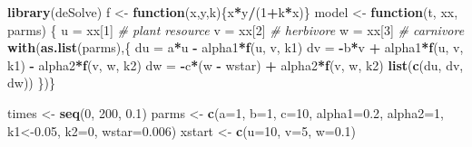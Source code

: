\documentclass[
]{book}
\newenvironment{Shaded}{\begin{snugshade}}{\end{snugshade}}
\newcommand{\AttributeTok}[1]{\textcolor[rgb]{0.13,0.29,0.53}{#1}}
\newcommand{\CommentTok}[1]{\textcolor[rgb]{0.56,0.35,0.01}{\textit{#1}}}
\newcommand{\ControlFlowTok}[1]{\textcolor[rgb]{0.13,0.29,0.53}{\textbf{#1}}}
\newcommand{\DecValTok}[1]{\textcolor[rgb]{0.00,0.00,0.81}{#1}}
\newcommand{\FloatTok}[1]{\textcolor[rgb]{0.00,0.00,0.81}{#1}}
\newcommand{\FunctionTok}[1]{\textcolor[rgb]{0.13,0.29,0.53}{\textbf{#1}}}
\newcommand{\NormalTok}[1]{#1}
\newcommand{\OtherTok}[1]{\textcolor[rgb]{0.56,0.35,0.01}{#1}}
\newcommand{\SpecialCharTok}[1]{\textcolor[rgb]{0.81,0.36,0.00}{\textbf{#1}}}
\theoremstyle{definition}
\theoremstyle{definition}
\theoremstyle{definition}
\theoremstyle{definition}
\theoremstyle{remark}
\begin{document}
\begin{Shaded}
\begin{Highlighting}[]
\FunctionTok{library}\NormalTok{(deSolve)}
\NormalTok{f }\OtherTok{\textless{}{-}} \ControlFlowTok{function}\NormalTok{(x,y,k)\{x}\SpecialCharTok{*}\NormalTok{y}\SpecialCharTok{/}\NormalTok{(}\DecValTok{1}\SpecialCharTok{+}\NormalTok{k}\SpecialCharTok{*}\NormalTok{x)\}}
\NormalTok{model }\OtherTok{\textless{}{-}} \ControlFlowTok{function}\NormalTok{(t, xx, parms) \{}
\NormalTok{    u }\OtherTok{=}\NormalTok{ xx[}\DecValTok{1}\NormalTok{] }\CommentTok{\# plant resource}
\NormalTok{    v }\OtherTok{=}\NormalTok{ xx[}\DecValTok{2}\NormalTok{] }\CommentTok{\# herbivore}
\NormalTok{    w }\OtherTok{=}\NormalTok{ xx[}\DecValTok{3}\NormalTok{] }\CommentTok{\# carnivore}
    \FunctionTok{with}\NormalTok{(}\FunctionTok{as.list}\NormalTok{(parms),\{}
\NormalTok{    du }\OtherTok{=}\NormalTok{ a}\SpecialCharTok{*}\NormalTok{u }\SpecialCharTok{{-}}\NormalTok{ alpha1}\SpecialCharTok{*}\FunctionTok{f}\NormalTok{(u, v, k1)}
\NormalTok{    dv }\OtherTok{=} \SpecialCharTok{{-}}\NormalTok{b}\SpecialCharTok{*}\NormalTok{v }\SpecialCharTok{+}\NormalTok{ alpha1}\SpecialCharTok{*}\FunctionTok{f}\NormalTok{(u, v, k1) }\SpecialCharTok{{-}}\NormalTok{ alpha2}\SpecialCharTok{*}\FunctionTok{f}\NormalTok{(v, w, k2)}
\NormalTok{    dw }\OtherTok{=} \SpecialCharTok{{-}}\NormalTok{c}\SpecialCharTok{*}\NormalTok{(w }\SpecialCharTok{{-}}\NormalTok{ wstar) }\SpecialCharTok{+}\NormalTok{ alpha2}\SpecialCharTok{*}\FunctionTok{f}\NormalTok{(v, w, k2)}
    \FunctionTok{list}\NormalTok{(}\FunctionTok{c}\NormalTok{(du, dv, dw))}
\NormalTok{\})\}}

\NormalTok{times }\OtherTok{\textless{}{-}} \FunctionTok{seq}\NormalTok{(}\DecValTok{0}\NormalTok{, }\DecValTok{200}\NormalTok{, }\FloatTok{0.1}\NormalTok{)}
\NormalTok{parms }\OtherTok{\textless{}{-}} \FunctionTok{c}\NormalTok{(}\AttributeTok{a=}\DecValTok{1}\NormalTok{, }\AttributeTok{b=}\DecValTok{1}\NormalTok{, }\AttributeTok{c=}\DecValTok{10}\NormalTok{, }\AttributeTok{alpha1=}\FloatTok{0.2}\NormalTok{, }\AttributeTok{alpha2=}\DecValTok{1}\NormalTok{,}
\NormalTok{k1}\OtherTok{\textless{}{-}}\FloatTok{0.05}\NormalTok{, }\AttributeTok{k2=}\DecValTok{0}\NormalTok{, }\AttributeTok{wstar=}\FloatTok{0.006}\NormalTok{)}
\NormalTok{xstart }\OtherTok{\textless{}{-}} \FunctionTok{c}\NormalTok{(}\AttributeTok{u=}\DecValTok{10}\NormalTok{, }\AttributeTok{v=}\DecValTok{5}\NormalTok{, }\AttributeTok{w=}\FloatTok{0.1}\NormalTok{)}
\end{Highlighting}
\end{Shaded}
\end{document}
